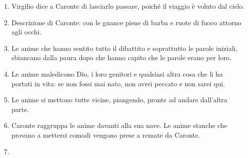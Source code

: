 \documentclass{article}
\begin{document}
\begin{enumerate}
{    disse: "Per altra via, per altri porti \\ 
    verrai a piaggia, non qui, per passare: \\ 
    più lieve legno convien che ti porti.
    }
    Caronte vede Dante e gli comanda di allontanarsi dalle anime morte poiché lui è una "anima viva", intendendo sia che Dante è ancora vivo, sia perché è un'anima già salva.
    \item 
    Virgilio dice a Caronte di lasciarlo passare, poiché il viaggio è voluto dal cielo.
    \item 
    Descrizione di Caronte: con le guance piene di barba e ruote di fuoco attorno agli occhi.
    \item 
    Le anime che hanno sentito tutto il dibattito e soprattutto le parole iniziali, sbiancano dalla paura dopo che hanno capito che le parole erano per loro.
    \item 
    Le anime maledicono Dio, i loro genitori e qualsiasi altra cosa che li ha portati in vita: se non fossi mai nato, non avrei peccato e non sarei qui.
    \item Le anime si mettono tutte vicine, piangendo, pronte ad andare dall'altra parte.
    \item 
    Caronte raggruppa le anime davanti alla sua nave. Le anime stanche che provano a mettersi comodi vengono prese a remate da Caronte.
    \item 
\end{enumerate}
\end{document}
